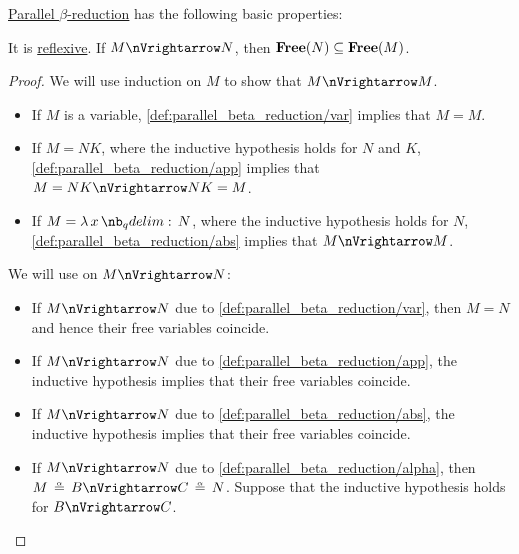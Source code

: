 \begin{proposition}\label{thm:def:parallel_beta_reduction}
  \hyperref[def:parallel_beta_reduction]{Parallel \( \beta \)-reduction} has the following basic properties:
  \begin{thmenum}
     It is \hyperref[def:binary_relation/reflexive]{reflexive}.
     If \( M \pred N \), then \( \op*{Free}(N) \subseteq \op*{Free}(M) \).
  \end{thmenum}
\end{proposition}
\begin{proof}
   We will use induction on \( M \) to show that \( M \pred M \).

  \begin{itemize}
    \item If \( M \) is a variable, \ref{def:parallel_beta_reduction/var} implies that \( M = M \).
    \item If \( M = NK \), where the inductive hypothesis holds for \( N \) and \( K \), \ref{def:parallel_beta_reduction/app} implies that \( M = NK \pred NK = M \).
    \item If \( M = \qabs x N \), where the inductive hypothesis holds for \( N \), \ref{def:parallel_beta_reduction/abs} implies that \( M \pred M \).
  \end{itemize}

   We will use  on \( M \pred N \):
  \begin{itemize}
    \item If \( M \pred N \) due to \ref{def:parallel_beta_reduction/var}, then \( M = N \) and hence their free variables coincide.

    \item If \( M \pred N \) due to \ref{def:parallel_beta_reduction/app}, the inductive hypothesis implies that their free variables coincide.

    \item If \( M \pred N \) due to \ref{def:parallel_beta_reduction/abs}, the inductive hypothesis implies that their free variables coincide.

    \item If \( M \pred N \) due to \ref{def:parallel_beta_reduction/alpha}, then \( M \aequiv B \pred C \aequiv N \). Suppose that the inductive hypothesis holds for \( B \pred C \).


\end{itemize}
\end{proof}
